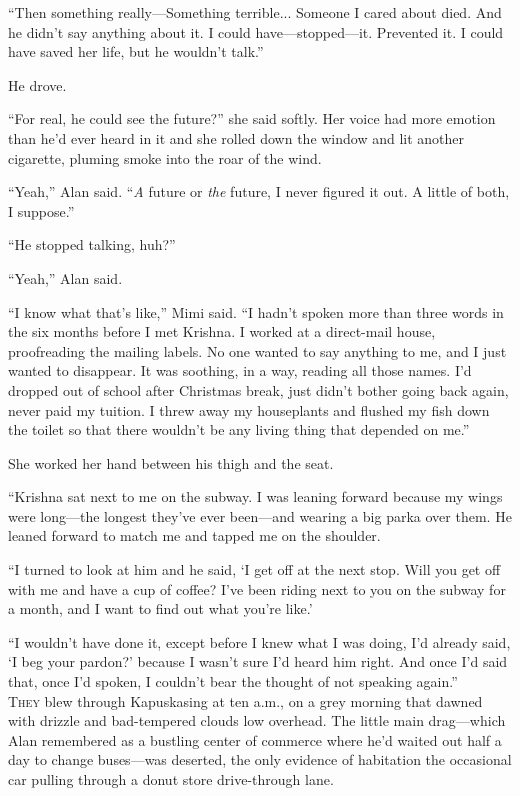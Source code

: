 ``Then something really---Something terrible...  Someone I cared about
died.  And he didn't say anything about it.  I could
have---stopped---it.  Prevented it.  I could have saved her life, but
he wouldn't talk.''

He drove.

``For real, he could see the future?'' she said softly.  Her voice had
more emotion than he'd ever heard in it and she rolled down the window
and lit another cigarette, pluming smoke into the roar of the wind.

``Yeah,'' Alan said.  ``\textit{A} future or \textit{the} future, I
never figured it out.  A little of both, I suppose.''

``He stopped talking, huh?''

``Yeah,'' Alan said.

``I know what that's like,'' Mimi said.  ``I hadn't spoken more than
three words in the six months before I met Krishna.  I worked at a
direct-mail house, proofreading the mailing labels.  No one wanted to
say anything to me, and I just wanted to disappear.  It was soothing,
in a way, reading all those names.  I'd dropped out of school after
Christmas break, just didn't bother going back again, never paid my
tuition.  I threw away my houseplants and flushed my fish down the
toilet so that there wouldn't be any living thing that depended on
me.''

She worked her hand between his thigh and the seat.

``Krishna sat next to me on the subway.  I was leaning forward because
my wings were long---the longest they've ever been---and wearing a big
parka over them.  He leaned forward to match me and tapped me on the
shoulder.

``I turned to look at him and he said, `I get off at the next stop. 
Will you get off with me and have a cup of coffee?  I've been riding
next to you on the subway for a month, and I want to find out what
you're like.'

``I wouldn't have done it, except before I knew what I was doing, I'd
already said, `I beg your pardon?' because I wasn't sure I'd heard him
right.  And once I'd said that, once I'd spoken, I couldn't bear the
thought of not speaking again.''
\\
\lettrine[lines=3, lhang=.5, nindent=0pt, findent=2pt]{T}{hey} blew through Kapuskasing at ten a.m., on a grey morning that
dawned with drizzle and bad-tempered clouds low overhead.  The little
main drag---which Alan remembered as a bustling center of commerce
where he'd waited out half a day to change buses---was deserted, the
only evidence of habitation the occasional car pulling through a donut
store drive-through lane.

